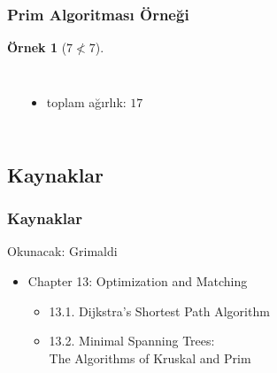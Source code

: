 \documentclass[dvipsnames]{beamer}
\theoremstyle{definition}
\theoremstyle{example}
\newtheorem{ornek}[theorem]{Örnek}
\theoremstyle{plain}
\begin{document}
\begin{frame}
  \frametitle{Prim Algoritması Örneği}

  \begin{ornek}[$7 \nless 7$]
    \begin{columns}
      \begin{center}
      \end{center}

      \begin{itemize}
        \item toplam ağırlık: $17$
      \end{itemize}
    \end{columns}
  \end{ornek}
\end{frame}

\subsection*{Kaynaklar}

\begin{frame}
  \frametitle{Kaynaklar}

  \begin{block}{Okunacak: Grimaldi}
    \begin{itemize}
      \item Chapter 13: Optimization and Matching
      \begin{itemize}
        \item 13.1. \alert{Dijkstra's Shortest Path Algorithm}
        \item 13.2. \alert{Minimal Spanning Trees:\\
			   The Algorithms of Kruskal and Prim}
      \end{itemize}
    \end{itemize}
  \end{block}
\end{frame}
\end{document}
